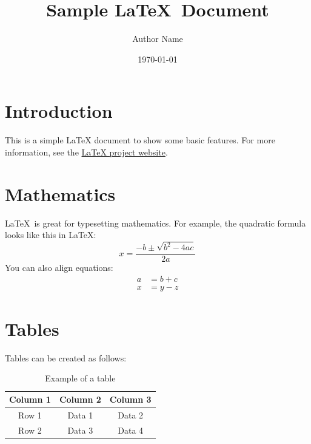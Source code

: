 \documentclass[12pt]{article}
\title{Sample \LaTeX\ Document}
\author{Author Name}
\date{\today}
\begin{document}
\maketitle

\section{Introduction}
This is a simple LaTeX document to show some basic features. For more information, see the \href{https://www.latex-project.org/}{LaTeX project website}.

\section{Mathematics}
\LaTeX\ is great for typesetting mathematics. For example, the quadratic formula looks like this in \LaTeX:
\[
x = \frac{{-b \pm \sqrt{{b^2 - 4ac}}}}{{2a}}
\]
You can also align equations:
\begin{align*}
a & = b + c \\
x & = y - z
\end{align*}

\section{Tables}
Tables can be created as follows:
\begin{table}[h!]
\centering
\begin{tabular}{|c|c|c|}
\hline
\textbf{Column 1} & \textbf{Column 2} & \textbf{Column 3} \\
\hline
Row 1 & Data 1 & Data 2 \\
Row 2 & Data 3 & Data 4 \\
\hline
\end{tabular}
\caption{Example of a table}
\label{tab:example_table}
\end{table}
\end{document}
